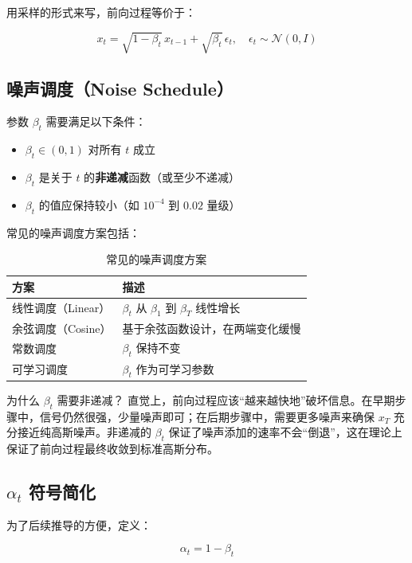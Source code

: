 \documentclass[a4paper]{article}
\begin{document}
用采样的形式来写，前向过程等价于：

$$x_t = \sqrt{1 - \beta_t} \, x_{t-1} + \sqrt{\beta_t} \, \epsilon_t, \quad \epsilon_t \sim \mathcal{N}(0, I)$$

\subsection{噪声调度（Noise Schedule）}

参数 $\beta_t$ 需要满足以下条件：

\begin{itemize}
    \item $\beta_t \in (0, 1)$ 对所有 $t$ 成立
    \item $\beta_t$ 是关于 $t$ 的\textbf{非递减}函数（或至少不递减）
    \item $\beta_t$ 的值应保持较小（如 $10^{-4}$ 到 $0.02$ 量级）
\end{itemize}

常见的噪声调度方案包括：

\begin{table}[H]
\centering
\begin{tabular}{ll}
\toprule
\textbf{方案} & \textbf{描述} \\
\midrule
线性调度（Linear） & $\beta_t$ 从 $\beta_1$ 到 $\beta_T$ 线性增长 \\
余弦调度（Cosine） & 基于余弦函数设计，在两端变化缓慢 \\
常数调度 & $\beta_t$ 保持不变 \\
可学习调度 & $\beta_t$ 作为可学习参数 \\
\bottomrule
\end{tabular}
\caption{常见的噪声调度方案}
\end{table}

\begin{knowledgebox}{为什么 $\beta_t$ 需要非递减？}
直觉上，前向过程应该``越来越快地''破坏信息。在早期步骤中，信号仍然很强，少量噪声即可；在后期步骤中，需要更多噪声来确保 $x_T$ 充分接近纯高斯噪声。非递减的 $\beta_t$ 保证了噪声添加的速率不会``倒退''，这在理论上保证了前向过程最终收敛到标准高斯分布。
\end{knowledgebox}

\subsection{$\alpha_t$ 符号简化}

为了后续推导的方便，定义：

$$\alpha_t = 1 - \beta_t$$
\end{document}
